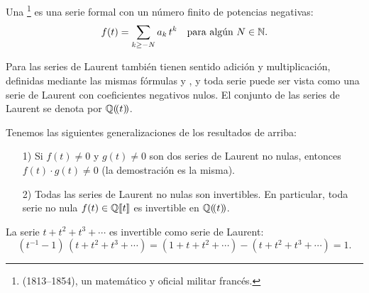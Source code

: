 \documentclass{article}
\begin{document}
\begin{definicion*}
Una \footnote{\href{http://www-history.mcs.st-andrews.ac.uk/Biographies/Laurent_Pierre.html}{} (1813--1854), un matemático y oficial militar francés.} es una serie formal con un número finito de potencias negativas:
$$f(t) = \sum_{k \ge -N} a_k\,t^k\quad \text{para algún }N\in \mathbb{N}.$$
\end{definicion*}

Para las series de Laurent también tienen sentido adición y multiplicación, definidas mediante las mismas fórmulas  y , y toda serie puede ser vista como una serie de Laurent con coeficientes negativos nulos. El conjunto de las series de Laurent se denota por $\mathbb{Q} (\!(t)\!)$.

\vspace{1em}

Tenemos las siguientes generalizaciones de los resultados de arriba:

\begin{enumerate}
\item[1)] Si $f (t) \ne 0$ y $g (t) \ne 0$ son dos series de Laurent no nulas, entonces $f (t) \cdot g (t) \ne 0$ (la demostración es la misma).

\item[2)] Todas las series de Laurent no nulas son invertibles. En particular, toda serie no nula $f (t) \in \mathbb{Q} [\![t]\!]$ es invertible en $\mathbb{Q} (\!(t)\!)$.
\end{enumerate}

\begin{ejemplo*}
La serie $t + t^2 + t^3 + \cdots$ es invertible como serie de Laurent:
$$(t^{-1} - 1)\,(t + t^2 + t^3 + \cdots) = (1 + t + t^2 + \cdots) - (t + t^2 + t^3 + \cdots) = 1.$$
\end{ejemplo*}
\end{document}
